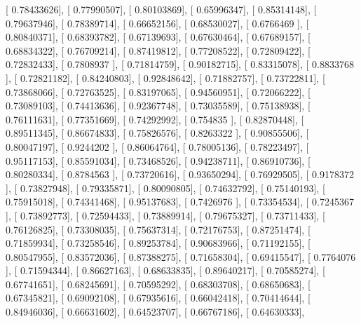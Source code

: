 \documentclass{article}
\begin{document}
       [ 0.78433626],
       [ 0.77990507],
       [ 0.80103869],
       [ 0.65996347],
       [ 0.85314148],
       [ 0.79637946],
       [ 0.78389714],
       [ 0.66652156],
       [ 0.68530027],
       [ 0.6766469 ],
       [ 0.80840371],
       [ 0.68393782],
       [ 0.67139693],
       [ 0.67630464],
       [ 0.67689157],
       [ 0.68834322],
       [ 0.76709214],
       [ 0.87419812],
       [ 0.77208522],
       [ 0.72809422],
       [ 0.72832433],
       [ 0.7808937 ],
       [ 0.71814759],
       [ 0.90182715],
       [ 0.83315078],
       [ 0.8833768 ],
       [ 0.72821182],
       [ 0.84240803],
       [ 0.92848642],
       [ 0.71882757],
       [ 0.73722811],
       [ 0.73868066],
       [ 0.72763525],
       [ 0.83197065],
       [ 0.94560951],
       [ 0.72066222],
       [ 0.73089103],
       [ 0.74413636],
       [ 0.92367748],
       [ 0.73035589],
       [ 0.75138938],
       [ 0.76111631],
       [ 0.77351669],
       [ 0.74292992],
       [ 0.754835  ],
       [ 0.82870448],
       [ 0.89511345],
       [ 0.86674833],
       [ 0.75826576],
       [ 0.8263322 ],
       [ 0.90855506],
       [ 0.80047197],
       [ 0.9244202 ],
       [ 0.86064764],
       [ 0.78005136],
       [ 0.78223497],
       [ 0.95117153],
       [ 0.85591034],
       [ 0.73468526],
       [ 0.94238711],
       [ 0.86910736],
       [ 0.80280334],
       [ 0.8784563 ],
       [ 0.73720616],
       [ 0.93650294],
       [ 0.76929505],
       [ 0.9178372 ],
       [ 0.73827948],
       [ 0.79335871],
       [ 0.80090805],
       [ 0.74632792],
       [ 0.75140193],
       [ 0.75915018],
       [ 0.74341468],
       [ 0.95137683],
       [ 0.7426976 ],
       [ 0.73354534],
       [ 0.7245367 ],
       [ 0.73892773],
       [ 0.72594433],
       [ 0.73889914],
       [ 0.79675327],
       [ 0.73711433],
       [ 0.76126825],
       [ 0.73308035],
       [ 0.75637314],
       [ 0.72176753],
       [ 0.87251474],
       [ 0.71859934],
       [ 0.73258546],
       [ 0.89253784],
       [ 0.90683966],
       [ 0.71192155],
       [ 0.80547955],
       [ 0.83572036],
       [ 0.87388275],
       [ 0.71658304],
       [ 0.69415547],
       [ 0.7764076 ],
       [ 0.71594344],
       [ 0.86627163],
       [ 0.68633835],
       [ 0.89640217],
       [ 0.70585274],
       [ 0.67741651],
       [ 0.68245691],
       [ 0.70595292],
       [ 0.68303708],
       [ 0.68650683],
       [ 0.67345821],
       [ 0.69092108],
       [ 0.67935616],
       [ 0.66042418],
       [ 0.70414644],
       [ 0.84946036],
       [ 0.66631602],
       [ 0.64523707],
       [ 0.66767186],
       [ 0.64630333],
\end{document}
